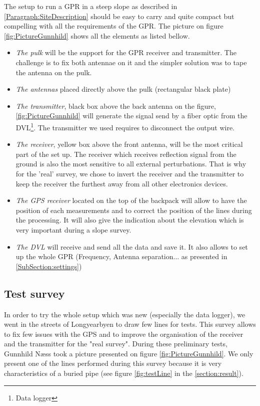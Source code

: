 The setup to run a GPR in a steep slope as described in \ref{Paragraph:SiteDescription} should be easy to carry and quite compact but compelling with all the requirements of the GPR. The picture on figure \ref{fig:PictureGunnhild} shows all the elements as listed bellow.



\begin{itemize}
    \item \emph{The pulk} will be the support for the GPR receiver and transmitter. The challenge is to fix both antennae on it and the simpler solution was to tape the antenna on the pulk.
    \item \emph{The antennas} placed directly above the pulk (rectangular black plate)
    \item \emph{The transmitter}, black box above the back antenna on the figure, \ref{fig:PictureGunnhild} will generate the signal send by a fiber optic from the DVL\footnote{Data logger}. The transmitter we used requires to disconnect the output wire.
    \item \emph{The receiver}, yellow box above the front antenna, will be the most critical part of the set up. The receiver which receives reflection signal from the ground is also the most sensitive to all external perturbations. That is why for the 'real' survey, we chose to invert the receiver and the transmitter to keep the receiver the furthest away from all other electronics devices.
\end{itemize}

\begin{itemize}
    \item \emph{The GPS receiver} located on the top of the backpack will allow to have the position of each measurements and to correct the position of the lines during the processing. It will also give the indication about the elevation which is very important during a slope survey.
    \item \emph{The DVL} will receive and send all the data and save it. It also allows to set up the whole GPR (Frequency, Antenna separation... as presented in \ref{SubSection:settings})
\end{itemize}



\subsection{Test survey} \label{Subsection:TestSurvey}


In order to try the whole setup which was new (especially the data logger), we went in the streets of Longyearbyen to draw few lines for tests. This survey allows to fix few issues with the GPS and to improve the organisation of the receiver and the transmitter for the "real survey". During these preliminary tests, Gunnhild Næss took a picture presented on figure \ref{fig:PictureGunnhild}. We only present one of the lines performed during this survey because it is very characteristics of a buried pipe (see figure \ref{fig:testLine} in the \ref{section:result}).

